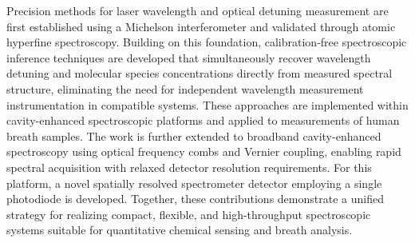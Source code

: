 Precision methods for laser wavelength and optical detuning measurement are first established using a Michelson interferometer and validated through atomic hyperfine spectroscopy. Building on this foundation, calibration-free spectroscopic inference techniques are developed that simultaneously recover wavelength detuning and molecular species concentrations directly from measured spectral structure, eliminating the need for independent wavelength measurement instrumentation in compatible systems. These approaches are implemented within cavity-enhanced spectroscopic platforms and applied to measurements of human breath samples. The work is further extended to broadband cavity-enhanced spectroscopy using optical frequency combs and Vernier coupling, enabling rapid spectral acquisition with relaxed detector resolution requirements. For this platform, a novel spatially resolved spectrometer detector employing a single photodiode is developed. Together, these contributions demonstrate a unified strategy for realizing compact, flexible, and high-throughput spectroscopic systems suitable for quantitative chemical sensing and breath analysis.



\pagebreak{}
